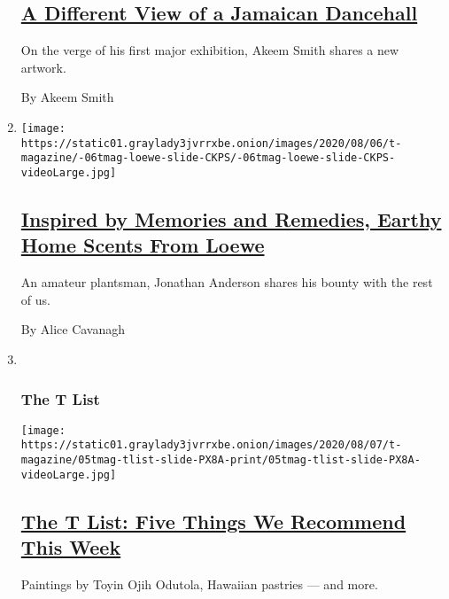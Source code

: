 \begin{enumerate}
  \hypertarget{a-different-view-of-a-jamaican-dancehall}{%
  \subsection{\texorpdfstring{\href{/2020/08/07/t-magazine/akeem-smith-art.html}{A
  Different View of a Jamaican
  Dancehall}}{A Different View of a Jamaican Dancehall}}\label{a-different-view-of-a-jamaican-dancehall}}

  On the verge of his first major exhibition, Akeem Smith shares a new
  artwork.

  By Akeem Smith
\item
  \texttt{[image: https://static01.graylady3jvrrxbe.onion/images/2020/08/06/t-magazine/-06tmag-loewe-slide-CKPS/-06tmag-loewe-slide-CKPS-videoLarge.jpg]}

  \hypertarget{inspired-by-memories-and-remedies-earthy-home-scents-from-loewe}{%
  \subsection{\texorpdfstring{\href{/2020/08/06/t-magazine/loewe-home-scents-candles.html}{Inspired
  by Memories and Remedies, Earthy Home Scents From
  Loewe}}{Inspired by Memories and Remedies, Earthy Home Scents From Loewe}}\label{inspired-by-memories-and-remedies-earthy-home-scents-from-loewe}}

  An amateur plantsman, Jonathan Anderson shares his bounty with the
  rest of us.

  By Alice Cavanagh
\item ~
  \hypertarget{the-t-list-2}{%
  \subsubsection{The T List}\label{the-t-list-2}}

  \texttt{[image: https://static01.graylady3jvrrxbe.onion/images/2020/08/07/t-magazine/05tmag-tlist-slide-PX8A-print/05tmag-tlist-slide-PX8A-videoLarge.jpg]}

  \hypertarget{the-t-list-five-things-we-recommend-this-week-2}{%
  \subsection{\texorpdfstring{\href{/2020/08/06/t-magazine/t-list-toyin-ojih-odutola.html}{The
  T List: Five Things We Recommend This
  Week}}{The T List: Five Things We Recommend This Week}}\label{the-t-list-five-things-we-recommend-this-week-2}}

  Paintings by Toyin Ojih Odutola, Hawaiian pastries --- and more.
\end{enumerate}

